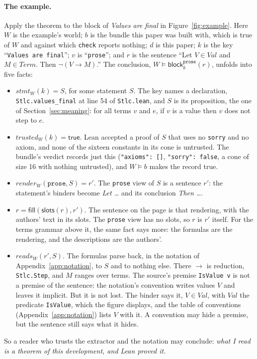 \documentclass[acmsmall,screen,review,anonymous,nonacm]{acmart}
\begin{document}
\paragraph{The example.} Apply the theorem to the block of \emph{Values
are final} in Figure~\ref{fig:example}. Here $W$ is the example's world;
$b$ is the bundle this paper was built with, which is true of $W$ and
against which \verb|check| reports nothing; $d$ is this paper; $k$ is the
key ``\texttt{Values are final}''; $v$ is ``\texttt{prose}''; and $r$ is the
sentence ``Let $V \in \mathit{Val}$ and $M \in \mathit{Term}$. Then
$\neg (V \longrightarrow M)$.'' The conclusion, $W \models \mathsf{block}^{\mathtt{prose}}_{k}(r)$,
unfolds into five facts:
\begin{itemize}
\item $\mathit{stmt}_{W}(k) = S$, for some statement $S$. The key names a
  declaration, \texttt{Stlc.values\_final} at line 54 of
  \texttt{Stlc.lean}, and $S$ is its proposition, the one of
  Section~\ref{sec:meaning}: for all terms $v$ and $e$, if $v$ is a value
  then $v$ does not step to $e$.
\item $\mathit{trusted}_{W}(k) = \mathsf{true}$. Lean accepted a proof of
  $S$ that uses no \texttt{sorry} and no axiom, and none of the sixteen
  constants in its cone is untrusted. The bundle's verdict records just
  this (\texttt{"axioms": []}, \texttt{"sorry": false}, a cone of size 16
  with nothing untrusted), and $W \models b$ makes the record true.
\item $\mathit{render}_{W}(\mathtt{prose}, S) = r'$. The \texttt{prose}
  view of $S$ is a sentence $r'$: the statement's binders become
  \emph{Let \ldots} and its conclusion \emph{Then \ldots}.
\item $r = \mathsf{fill}(\mathsf{slots}(r), r')$. The sentence on the page
  is that rendering, with the authors' text in its slots. The
  \texttt{prose} view has no slots, so $r$ is $r'$ itself. For the terms
  grammar above it, the same fact says more: the formulas are the
  rendering, and the descriptions are the authors'.
\item $\mathit{reads}_{W}(r', S)$. The formulas parse back, in the
  notation of Appendix~\ref{app:notation}, to $S$ and to nothing else.
  There $\longrightarrow$ is reduction, \texttt{Stlc.Step}, and $M$ ranges
  over terms. The source's premise \texttt{IsValue v} is not a premise of
  the sentence: the notation's convention writes values $V$ and leaves it
  implicit. But it is not lost. The binder says it, $V \in \mathit{Val}$,
  with $\mathit{Val}$ the predicate \texttt{IsValue}, which the figure
  displays, and the table of conventions (Appendix~\ref{app:notation})
  lists $V$ with it. A convention may hide a premise, but the sentence
  still says what it hides.
\end{itemize}
So a reader who trusts the extractor and the notation may conclude:
\emph{what I read is a theorem of this development, and Lean proved it.}
\end{document}
